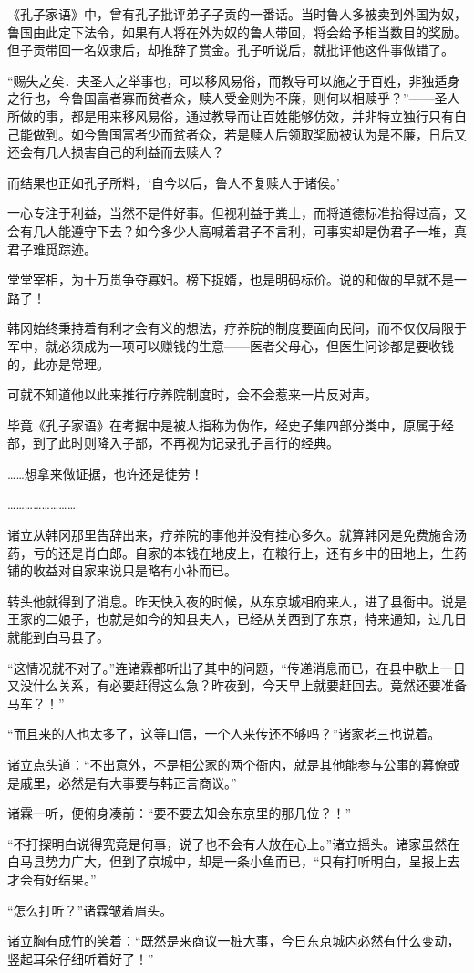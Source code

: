 《孔子家语》中，曾有孔子批评弟子子贡的一番话。当时鲁人多被卖到外国为奴，鲁国由此定下法令，如果有人将在外为奴的鲁人带回，将会给予相当数目的奖励。但子贡带回一名奴隶后，却推辞了赏金。孔子听说后，就批评他这件事做错了。

“赐失之矣．夫圣人之举事也，可以移风易俗，而教导可以施之于百姓，非独适身之行也，今鲁国富者寡而贫者众，赎人受金则为不廉，则何以相赎乎？”——圣人所做的事，都是用来移风易俗，通过教导而让百姓能够仿效，并非特立独行只有自己能做到。如今鲁国富者少而贫者众，若是赎人后领取奖励被认为是不廉，日后又还会有几人损害自己的利益而去赎人？

而结果也正如孔子所料，‘自今以后，鲁人不复赎人于诸侯。’

一心专注于利益，当然不是件好事。但视利益于粪土，而将道德标准抬得过高，又会有几人能遵守下去？如今多少人高喊着君子不言利，可事实却是伪君子一堆，真君子难觅踪迹。

堂堂宰相，为十万贯争夺寡妇。榜下捉婿，也是明码标价。说的和做的早就不是一路了！

韩冈始终秉持着有利才会有义的想法，疗养院的制度要面向民间，而不仅仅局限于军中，就必须成为一项可以赚钱的生意——医者父母心，但医生问诊都是要收钱的，此亦是常理。

可就不知道他以此来推行疗养院制度时，会不会惹来一片反对声。

毕竟《孔子家语》在考据中是被人指称为伪作，经史子集四部分类中，原属于经部，到了此时则降入子部，不再视为记录孔子言行的经典。

……想拿来做证据，也许还是徒劳！

……………………

诸立从韩冈那里告辞出来，疗养院的事他并没有挂心多久。就算韩冈是免费施舍汤药，亏的还是肖白郎。自家的本钱在地皮上，在粮行上，还有乡中的田地上，生药铺的收益对自家来说只是略有小补而已。

转头他就得到了消息。昨天快入夜的时候，从东京城相府来人，进了县衙中。说是王家的二娘子，也就是如今的知县夫人，已经从关西到了东京，特来通知，过几日就能到白马县了。

“这情况就不对了。”连诸霖都听出了其中的问题，“传递消息而已，在县中歇上一日又没什么关系，有必要赶得这么急？昨夜到，今天早上就要赶回去。竟然还要准备马车？！”

“而且来的人也太多了，这等口信，一个人来传还不够吗？”诸家老三也说着。

诸立点头道：“不出意外，不是相公家的两个衙内，就是其他能参与公事的幕僚或是戚里，必然是有大事要与韩正言商议。”

诸霖一听，便俯身凑前：“要不要去知会东京里的那几位？！”

“不打探明白说得究竟是何事，说了也不会有人放在心上。”诸立摇头。诸家虽然在白马县势力广大，但到了京城中，却是一条小鱼而已，“只有打听明白，呈报上去才会有好结果。”

“怎么打听？”诸霖皱着眉头。

诸立胸有成竹的笑着：“既然是来商议一桩大事，今日东京城内必然有什么变动，竖起耳朵仔细听着好了！”

